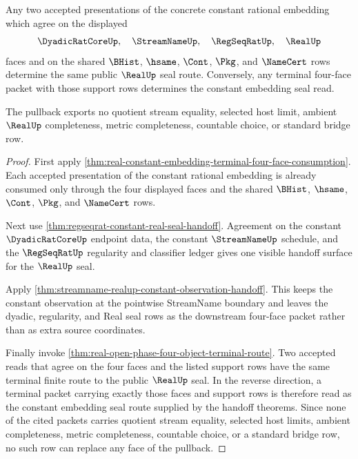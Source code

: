 \begin{theorem}
\label{thm:real-constant-embedding-terminal-four-face-pullback}
Any two accepted presentations of the concrete constant rational embedding
which agree on the displayed
$$
\DyadicRatCoreUp,\quad \StreamNameUp,\quad \RegSeqRatUp,\quad \RealUp
$$
faces and on the shared $\BHist$, $\hsame$, $\Cont$, $\Pkg$, and $\NameCert$
rows determine the same public $\RealUp$ seal route. Conversely, any terminal
four-face packet with those support rows determines the constant embedding
seal read.

The pullback exports no quotient stream equality, selected host limit,
ambient $\RealUp$ completeness, metric completeness, countable choice, or
standard bridge row.
\end{theorem}
\begin{proof}
First apply
\autoref{thm:real-constant-embedding-terminal-four-face-consumption}. Each
accepted presentation of the constant rational embedding is already consumed
only through the four displayed faces and the shared $\BHist$, $\hsame$,
$\Cont$, $\Pkg$, and $\NameCert$ rows.

Next use \autoref{thm:regseqrat-constant-real-seal-handoff}. Agreement on the
constant $\DyadicRatCoreUp$ endpoint data, the constant $\StreamNameUp$
schedule, and the $\RegSeqRatUp$ regularity and classifier ledger gives one
visible handoff surface for the $\RealUp$ seal.

Apply \autoref{thm:streamname-realup-constant-observation-handoff}. This keeps
the constant observation at the pointwise StreamName boundary and leaves the
dyadic, regularity, and Real seal rows as the downstream four-face packet
rather than as extra source coordinates.

Finally invoke \autoref{thm:real-open-phase-four-object-terminal-route}. Two
accepted reads that agree on the four faces and the listed support rows have
the same terminal finite route to the public $\RealUp$ seal. In the reverse
direction, a terminal packet carrying exactly those faces and support rows is
therefore read as the constant embedding seal route supplied by the handoff
theorems. Since none of the cited packets carries quotient stream equality,
selected host limits, ambient completeness, metric completeness, countable
choice, or a standard bridge row, no such row can replace any face of the
pullback.
\end{proof}

